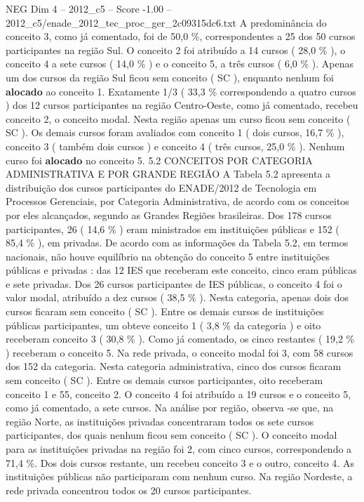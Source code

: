 \begin{textsample}{NEG Dim 4 – 2012\_c5 – Score -1.00 – 2012\_c5/enade\_2012\_tec\_proc\_ger\_2c09315dc6.txt}
A predominância do conceito 3, como já comentado, foi de 50,0 \%, correspondentes a 25 dos 50 cursos participantes na região Sul.
O conceito 2 foi atribuído a 14 cursos ( 28,0 \% ), o conceito 4 a sete cursos ( 14,0 \% ) e o conceito 5, a três cursos ( 6,0 \% ).
Apenas um dos cursos da região Sul ficou sem conceito ( SC ), enquanto nenhum foi \textbf{alocado} ao conceito 1.
Exatamente 1/3 ( 33,3 \% correspondendo a quatro cursos ) dos 12 cursos participantes na região Centro-Oeste, como já comentado, recebeu conceito 2, o conceito modal.
Nesta região apenas um curso ficou sem conceito ( SC ).
Os demais cursos foram avaliados com conceito 1 ( dois cursos, 16,7 \% ), conceito 3 ( também dois cursos ) e conceito 4 ( três cursos, 25,0 \% ).
Nenhum curso foi \textbf{alocado} no conceito 5. 5.2 CONCEITOS POR CATEGORIA ADMINISTRATIVA E POR GRANDE REGIÃO A Tabela 5.2 apresenta a distribuição dos cursos participantes do ENADE/2012 de Tecnologia em Processos Gerenciais, por Categoria Administrativa, de acordo com os conceitos por eles alcançados, segundo as Grandes Regiões brasileiras.
Dos 178 cursos participantes, 26 ( 14,6 \% ) eram ministrados em instituições públicas e 152 ( 85,4 \% ), em privadas.
De acordo com as informações da Tabela 5.2, em termos nacionais, não houve equilíbrio na obtenção do conceito 5 entre instituições públicas e privadas : das 12 IES que receberam este conceito, cinco eram públicas e sete privadas.
Dos 26 cursos participantes de IES públicas, o conceito 4 foi o valor modal, atribuído a dez cursos ( 38,5 \% ).
Nesta categoria, apenas dois dos cursos ficaram sem conceito ( SC ).
Entre os demais cursos de instituições públicas participantes, um obteve conceito 1 ( 3,8 \% da categoria ) e oito receberam conceito 3 ( 30,8 \% ).
Como já comentado, os cinco restantes ( 19,2 \% ) receberam o conceito 5.
Na rede privada, o conceito modal foi 3, com 58 cursos dos 152 da categoria.
Nesta categoria administrativa, cinco dos cursos ficaram sem conceito ( SC ).
Entre os demais cursos participantes, oito receberam conceito 1 e 55, conceito 2.
O conceito 4 foi atribuído a 19 cursos e o conceito 5, como já comentado, a sete cursos.
Na análise por região, observa -se que, na região Norte, as instituições privadas concentraram todos os sete cursos participantes, dos quais nenhum ficou sem conceito ( SC ).
O conceito modal para as instituições privadas na região foi 2, com cinco cursos, correspondendo a 71,4 \%.
Dos dois cursos restante, um recebeu conceito 3 e o outro, conceito 4.
As instituições públicas não participaram com nenhum curso.
Na região Nordeste, a rede privada concentrou todos os 20 cursos participantes.

\end{textsample}
